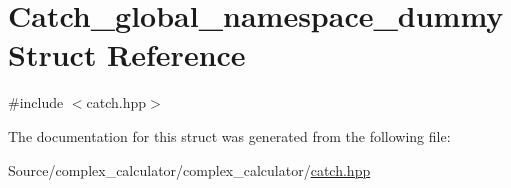\hypertarget{struct_catch__global__namespace__dummy}{}\section{Catch\+\_\+global\+\_\+namespace\+\_\+dummy Struct Reference}
\label{struct_catch__global__namespace__dummy}


{\ttfamily \#include $<$catch.\+hpp$>$}



The documentation for this struct was generated from the following file\+:\begin{DoxyCompactItemize}
\item 
Source/complex\+\_\+calculator/complex\+\_\+calculator/\mbox{\hyperlink{catch_8hpp}{catch.\+hpp}}\end{DoxyCompactItemize}
